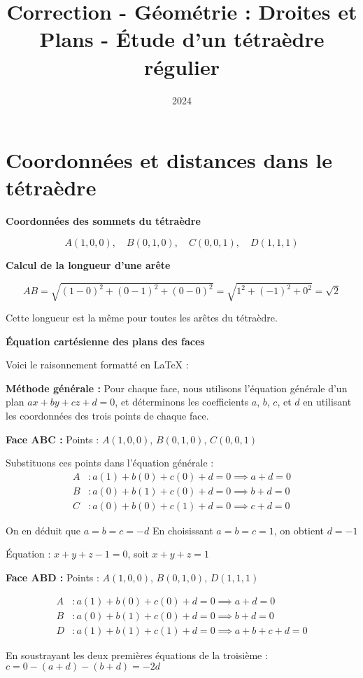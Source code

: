 \documentclass[10pt,a4paper]{article}
\title{Correction - Géométrie : Droites et Plans - Étude d'un tétraèdre régulier}
\author{}
\date{2024}
\begin{document}
\section{Coordonnées et distances dans le tétraèdre}

\q \textbf{Coordonnées des sommets du tétraèdre}

\[
A(1,0,0), \quad B(0,1,0), \quad C(0,0,1),  \quad D(1,1,1)
\]


\q \textbf{Calcul de la longueur d'une arête}

$$
AB = \sqrt{(1-0)^2 + (0-1)^2 + (0-0)^2} = \sqrt{1^2 + (-1)^2 + 0^2} = \sqrt{2}
$$

Cette longueur est la même pour toutes les arêtes du tétraèdre.


\q \textbf{Équation cartésienne des plans des faces}

Voici le raisonnement formatté en LaTeX :

\textbf{Méthode générale :}
Pour chaque face, nous utilisons l'équation générale d'un plan $ax + by + cz + d = 0$, et déterminons les coefficients $a$, $b$, $c$, et $d$ en utilisant les coordonnées des trois points de chaque face.

\textbf{Face ABC :}
Points : $A(1,0,0)$, $B(0,1,0)$, $C(0,0,1)$

Substituons ces points dans l'équation générale :
\begin{align*}
A &: a(1) + b(0) + c(0) + d = 0 \implies a + d = 0 \\
B &: a(0) + b(1) + c(0) + d = 0 \implies b + d = 0 \\
C &: a(0) + b(0) + c(1) + d = 0 \implies c + d = 0
\end{align*}

On en déduit que $a = b = c = -d$
En choisissant $a = b = c = 1$, on obtient $d = -1$

Équation : $x + y + z - 1 = 0$, soit $x + y + z = 1$

\textbf{Face ABD :}
Points : $A(1,0,0)$, $B(0,1,0)$, $D(1,1,1)$

\begin{align*}
A &: a(1) + b(0) + c(0) + d = 0 \implies a + d = 0 \\
B &: a(0) + b(1) + c(0) + d = 0 \implies b + d = 0 \\
D &: a(1) + b(1) + c(1) + d = 0 \implies a + b + c + d = 0
\end{align*}

En soustrayant les deux premières équations de la troisième :
$c = 0 - (a + d) - (b + d) = -2d$
\end{document}
